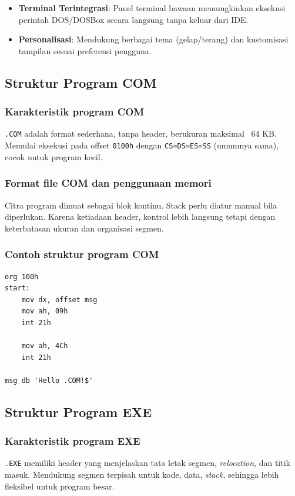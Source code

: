 \documentclass[../main.tex]{subfiles}
\begin{document}
\begin{itemize}
    \item \textbf{Terminal Terintegrasi}: Panel terminal bawaan memungkinkan eksekusi perintah DOS/DOSBox secara langsung tanpa keluar dari IDE.
    
    \item \textbf{Personalisasi}: Mendukung berbagai tema (gelap/terang) dan kustomisasi tampilan sesuai preferensi pengguna.
\end{itemize}

        \subsection{Struktur Program COM}
            \subsubsection{Karakteristik program COM}
\texttt{.COM} adalah format sederhana, tanpa header, berukuran maksimal ~64 KB. Memulai eksekusi pada offset \texttt{0100h} dengan \texttt{CS=DS=ES=SS} (umumnya sama), cocok untuk program kecil.

            \subsubsection{Format file COM dan penggunaan memori}
Citra program dimuat sebagai blok kontinu. Stack perlu diatur manual bila diperlukan. Karena ketiadaan header, kontrol lebih langsung tetapi dengan keterbatasan ukuran dan organisasi segmen.

            \subsubsection{Contoh struktur program COM}
\begin{lstlisting}[language={[x86masm]Assembler}, caption={Contoh Struktur Program COM}, label={lst:program-com}]
org 100h
start:
    mov dx, offset msg
    mov ah, 09h
    int 21h

    mov ah, 4Ch
    int 21h

msg db 'Hello .COM!$'
\end{lstlisting}

        \subsection{Struktur Program EXE}
            \subsubsection{Karakteristik program EXE}
\texttt{.EXE} memiliki header yang menjelaskan tata letak segmen, \textit{relocation}, dan titik masuk. Mendukung segmen terpisah untuk kode, data, \textit{stack}, sehingga lebih fleksibel untuk program besar.
\end{document}
